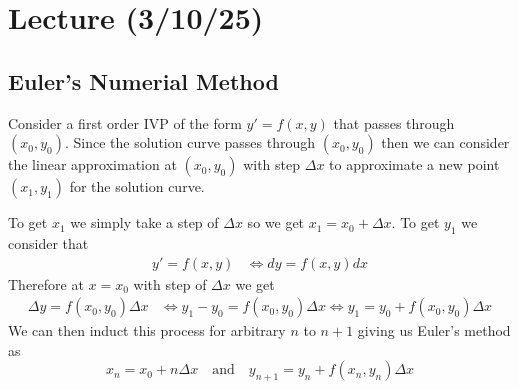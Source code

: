 \documentclass[notes]{subfiles}
\begin{document}
\setcounter{section}{13}
\section{Lecture (3/10/25)}

\subsection{Euler's Numerial Method}
Consider a first order IVP of the form $y' = f(x, y)$ that passes through $(x_0, y_0)$. Since the solution curve passes through $(x_0, y_0)$ then we can consider the linear approximation at $(x_0, y_0)$ with step $\Delta x$ to approximate a new point $(x_1, y_1)$ for the solution curve.

To get $x_1$ we simply take a step of $\Delta x$ so we get $x_1 = x_0 + \Delta x$.
To get $y_1$ we consider that
\begin{align*}
    y' = f(x, y)
    &\iff dy = f(x, y)dx
\end{align*}
Therefore at $x = x_0$ with step of $\Delta x$ we get
\begin{align*}
    \Delta y = f(x_0, y_0)\Delta x
    &\iff y_1 - y_0 = f(x_0, y_0)\Delta x
    \iff y_1 = y_0 + f(x_0, y_0)\Delta x
\end{align*}
We can then induct this process for arbitrary $n$ to $n + 1$ giving us Euler's method as
\begin{equation} \label{euler_num_method}
    x_n = x_0 + n\Delta x \quad \text{and} \quad y_{n + 1} = y_n + f(x_n, y_n)\Delta x
\end{equation}
\end{document}
